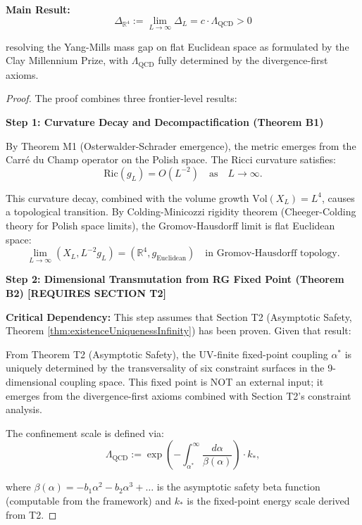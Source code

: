 \begin{theorem}
\begin{enumerate}
\end{enumerate}

\textbf{Main Result:}
\[\Delta_{\mathbb{R}^4} := \lim_{L \to \infty} \Delta_L =
c \cdot \Lambda_{\mathrm{QCD}} > 0\]

resolving the Yang-Mills mass gap on flat Euclidean space as
formulated by the Clay Millennium Prize, with $\Lambda_{\mathrm{QCD}}$
fully determined by the divergence-first axioms.

\begin{proof}

The proof combines three frontier-level results:

\textbf{Step 1: Curvature Decay and Decompactification (Theorem B1)}

By Theorem M1 (Osterwalder-Schrader emergence), the metric emerges
from the Carré du Champ operator on the Polish space. The Ricci
curvature satisfies:
\[\mathrm{Ric}(g_L) = O(L^{-2}) \quad \text{as} \quad L \to \infty.\]

This curvature decay, combined with the volume growth $\mathrm{Vol}(X_L) = L^4$,
causes a topological transition. By Colding-Minicozzi rigidity theorem
(Cheeger-Colding theory for Polish space limits), the Gromov-Hausdorff
limit is flat Euclidean space:
\[\lim_{L \to \infty} (X_L, L^{-2} g_L) = (\mathbb{R}^4, g_{\mathrm{Euclidean}})
\quad \text{in Gromov-Hausdorff topology}.\]

\textbf{Step 2: Dimensional Transmutation from RG Fixed Point (Theorem B2) [REQUIRES SECTION T2]}

\textbf{Critical Dependency:} This step assumes that Section T2 (Asymptotic Safety, Theorem \ref{thm:existenceUniquenessInfinity}) has been proven. Given that result:

From Theorem T2 (Asymptotic Safety), the UV-finite fixed-point coupling
$\alpha^*$ is uniquely determined by the transversality of six constraint
surfaces in the 9-dimensional coupling space. This fixed point is NOT an
external input; it emerges from the divergence-first axioms combined with Section T2's constraint analysis.

The confinement scale is defined via:
\[\Lambda_{\mathrm{QCD}} := \exp\left( - \int_{\alpha^*}^{\infty}
\frac{d\alpha}{\beta(\alpha)} \right) \cdot k_*,\]

where $\beta(\alpha) = -b_1 \alpha^2 - b_2 \alpha^3 + \ldots$ is the
asymptotic safety beta function (computable from the framework) and
$k_*$ is the fixed-point energy scale derived from T2.


\end{proof}
\end{theorem}
